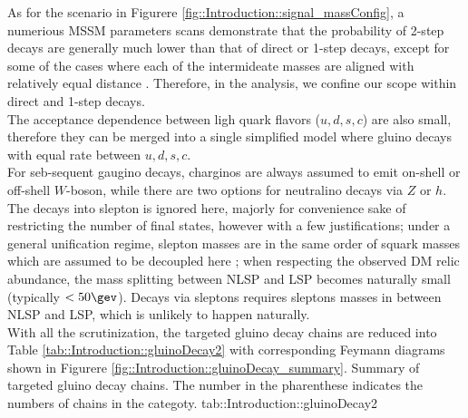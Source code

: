 As for the scenario in Figurere \ref{fig::Introduction::signal_massConfig}, a numerious MSSM parameters scans demonstrate that the probability of 2-step decays are generally much lower than that of direct or 1-step decays, except for some of the cases where each of the intermideate masses are aligned with relatively equal distance 
. Therefore, in the analysis, we confine our scope within direct and 1-step decays. \\

The acceptance dependence between ligh quark flavors ($u,d,s,c$) are also small, therefore they can be merged into a single simplified model where gluino decays with equal rate between $u,d,s,c$. \\

For seb-sequent gaugino decays, charginos are always assumed to emit on-shell or off-shell $W$-boson, while there are two options for neutralino decays via $Z$ or $h$. The decays into slepton is ignored here, majorly for convenience sake of restricting the number of final states, however with a few justifications; under a general unification regime, slepton masses are in the same order of squark masses which are assumed to be decoupled here ; when respecting the observed DM relic abundance, the mass splitting between NLSP and LSP becomes naturally small (typically $<50\gev$). Decays via sleptons requires sleptons masses in between NLSP and LSP, which is unlikely to happen naturally. \\

With all the scrutinization, the targeted gluino decay chains are reduced into Table \ref{tab::Introduction::gluinoDecay2}
with corresponding Feymann diagrams shown in Figurere \ref{fig::Introduction::gluinoDecay_summary}. 
{Summary of targeted gluino decay chains. The number in the pharenthese indicates the numbers of chains in the categoty.}
{tab::Introduction::gluinoDecay2}


